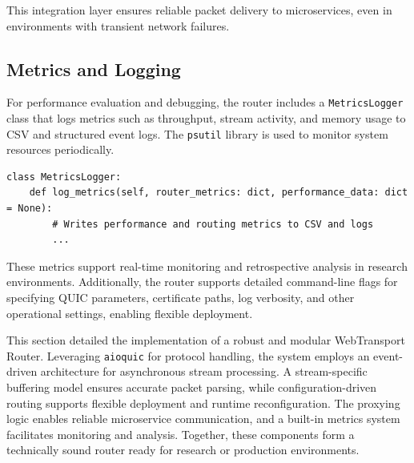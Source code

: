 This integration layer ensures reliable packet delivery to microservices, even in environments with transient network failures.

\subsection{Metrics and Logging}
For performance evaluation and debugging, the router includes a \texttt{MetricsLogger} class that logs metrics such as throughput, stream activity, and memory usage to CSV and structured event logs. The \texttt{psutil} library is used to monitor system resources periodically.

\begin{lstlisting}
class MetricsLogger:
    def log_metrics(self, router_metrics: dict, performance_data: dict = None):
        # Writes performance and routing metrics to CSV and logs
        ...
\end{lstlisting}

These metrics support real-time monitoring and retrospective analysis in research environments. Additionally, the router supports detailed command-line flags for specifying QUIC parameters, certificate paths, log verbosity, and other operational settings, enabling flexible deployment.

This section detailed the implementation of a robust and modular WebTransport Router. Leveraging \texttt{aioquic} for protocol handling, the system employs an event-driven architecture for asynchronous stream processing. A stream-specific buffering model ensures accurate packet parsing, while configuration-driven routing supports flexible deployment and runtime reconfiguration. The proxying logic enables reliable microservice communication, and a built-in metrics system facilitates monitoring and analysis. Together, these components form a technically sound router ready for research or production environments.








